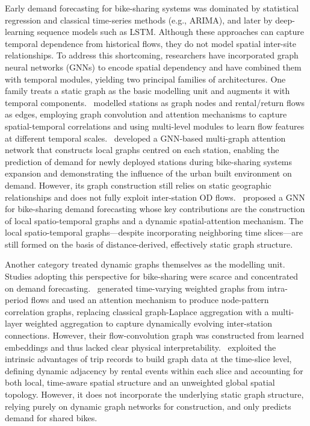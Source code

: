 \documentclass[preprint,12pt,authoryear]{elsarticle}
\begin{document}
Early demand forecasting for bike-sharing systems was dominated by statistical regression and classical time-series methods (e.g., ARIMA), and later by deep-learning sequence models such as LSTM. Although these approaches can capture temporal dependence from historical flows, they do not model spatial inter-site relationships. To address this shortcoming, researchers have incorporated graph neural networks (GNNs) to encode spatial dependency and have combined them with temporal modules, yielding two principal families of architectures. One family treats a static graph as the basic modelling unit and augments it with temporal components.~\cite{he2020towards} modelled stations as graph nodes and rental/return flows as edges, employing graph convolution and attention mechanisms to capture spatial-temporal correlations and using multi-level modules to learn flow features at different temporal scales.~\cite{liang2023deep} developed a GNN-based multi-graph attention network that constructs local graphs centred on each station, enabling the prediction of demand for newly deployed stations during bike-sharing systems expansion and demonstrating the influence of the urban built environment on demand. However, its graph construction still relies on static geographic relationships and does not fully exploit inter-station OD flows.~\cite{sun2024public} proposed a GNN for bike-sharing demand forecasting whose key contributions are the construction of local spatio-temporal graphs and a dynamic spatial-attention mechanism. The local spatio-temporal graphs—despite incorporating neighboring time slices—are still formed on the basis of distance-derived, effectively static graph structure.

Another category treated dynamic graphs themselves as the modelling unit. Studies adopting this perspective for bike-sharing were scarce and concentrated on demand forecasting.~\cite{li2022data} generated time-varying weighted graphs from intra-period flows and used an attention mechanism to produce node-pattern correlation graphs, replacing classical graph-Laplace aggregation with a multi-layer weighted aggregation to capture dynamically evolving inter-station connections. However, their flow-convolution graph was constructed from learned embeddings and thus lacked clear physical interpretability.~\cite{feng2024spatial} exploited the intrinsic advantages of trip records to build graph data at the time-slice level, defining dynamic adjacency by rental events within each slice and accounting for both local, time-aware spatial structure and an unweighted global spatial topology. However, it does not incorporate the underlying static graph structure, relying purely on dynamic graph networks for construction, and only predicts demand for shared bikes.
\end{document}
